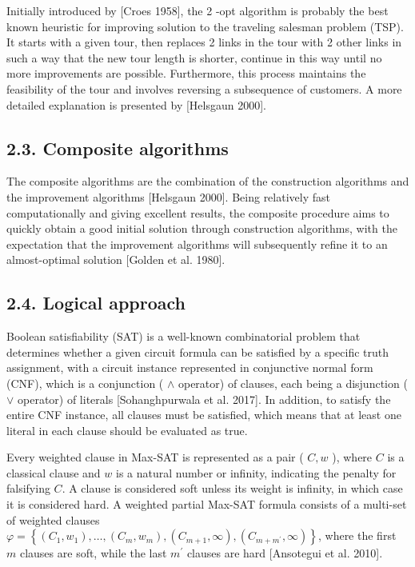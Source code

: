 \documentclass[10pt]{article}
\begin{document}
Initially introduced by [Croes 1958], the 2 -opt algorithm is probably the best known heuristic for improving solution to the traveling salesman problem (TSP). It starts with a given tour, then replaces 2 links in the tour with 2 other links in such a way that the new tour length is shorter, continue in this way until no more improvements are possible. Furthermore, this process maintains the feasibility of the tour and involves reversing a subsequence of customers. A more detailed explanation is presented by [Helsgaun 2000].

\subsection*{2.3. Composite algorithms}
The composite algorithms are the combination of the construction algorithms and the improvement algorithms [Helsgaun 2000]. Being relatively fast computationally and giving excellent results, the composite procedure aims to quickly obtain a good initial solution through construction algorithms, with the expectation that the improvement algorithms will subsequently refine it to an almost-optimal solution [Golden et al. 1980].

\subsection*{2.4. Logical approach}
Boolean satisfiability (SAT) is a well-known combinatorial problem that determines whether a given circuit formula can be satisfied by a specific truth assignment, with a circuit instance represented in conjunctive normal form (CNF), which is a conjunction ( $\wedge$ operator) of clauses, each being a disjunction ( $\vee$ operator) of literals [Sohanghpurwala et al. 2017]. In addition, to satisfy the entire CNF instance, all clauses must be satisfied, which means that at least one literal in each clause should be evaluated as true.

Every weighted clause in Max-SAT is represented as a pair ( $C, w$ ), where $C$ is a classical clause and $w$ is a natural number or infinity, indicating the penalty for falsifying $C$. A clause is considered soft unless its weight is infinity, in which case it is considered hard. A weighted partial Max-SAT formula consists of a multi-set of weighted clauses $\varphi=\left\{\left(C_{1}, w_{1}\right), \ldots,\left(C_{m}, w_{m}\right),\left(C_{m+1}, \infty\right),\left(C_{m+m^{\prime}}, \infty\right)\right\}$, where the first $m$ clauses are soft, while the last $m^{\prime}$ clauses are hard [Ansotegui et al. 2010].
\end{document}
